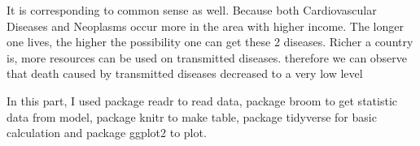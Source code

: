 \documentclass[11pt,a4paper,]{article}
\begin{document}
It is corresponding to common sense as well. Because both Cardiovascular Diseases and Neoplasms occur more in the area with higher income. The longer one lives, the higher the possibility one can get these 2 diseases. Richer a country is, more resources can be used on transmitted diseases. therefore we can observe that death caused by transmitted diseases decreased to a very low level

In this part, I used package readr \textcite{readr} to read data, package broom \textcite{broom} to get statistic data from model, package knitr \textcite{knitr} to make table, package tidyverse \textcite{tidyverse} for basic calculation and package ggplot2 \textcite{ggplot2} to plot.

\printbibliography
\end{document}
